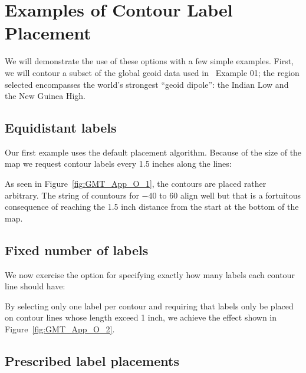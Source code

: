 \section{Examples of Contour Label Placement}

We will demonstrate the use of these options with a few simple examples.
First, we will contour a subset of the global geoid data used in \GMT\ Example 01;
the region selected encompasses the world's strongest ``geoid dipole'': the Indian Low
and the New Guinea High.

\subsection{Equidistant labels}

Our first example uses the default placement algorithm.  Because of the size
of the map we request contour labels every 1.5 inches along the lines:



\noindent
As seen in Figure~\ref{fig:GMT_App_O_1}, the contours are placed rather arbitrary.
The string of countours for $-40$ to $60$ align well but that is a fortuitous 
consequence of reaching the 1.5 inch distance from the start at the bottom of the map.


\subsection{Fixed number of labels}

We now exercise the option for specifying exactly how many labels each contour line
should have:



\noindent
By selecting only one label per contour and requiring that labels only be placed on
contour lines whose length exceed 1 inch, we achieve the effect shown in Figure~\ref{fig:GMT_App_O_2}.


\subsection{Prescribed label placements}

